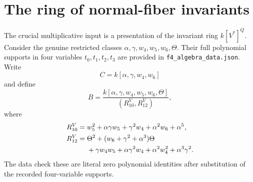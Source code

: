 \documentclass[11pt,a4paper]{article}
\theoremstyle{remark}\newtheorem{remark}[theorem]{Remark}
\begin{document}
\section{The ring of normal-fiber invariants}\label{sec:fiber}
The crucial multiplicative input is a presentation of the invariant ring \(k[V^*]^Q\). Consider the genuine restricted classes \(\alpha,\gamma,w_4,w_5,w_6,\Theta\). Their full polynomial supports in four variables \(t_0,t_1,t_2,t_3\) are provided in \texttt{f4\_algebra\_data.json}. Write
\[C=k[\alpha,\gamma,w_4,w_6]\]
and define
\begin{equation}\label{eq:Bfiber}
B=\frac{k[\alpha,\gamma,w_4,w_5,w_6,\Theta]}
{(R_{10}^{V},R_{12}^{V})},
\end{equation}
where
\begin{align}
R_{10}^{V}={}&w_5^2+\alpha\gamma w_5+\gamma^2w_4+\alpha^2w_6+\alpha^5,\label{eq:fiber10}\\
R_{12}^{V}={}&\Theta^2+(w_6+\gamma^2+\alpha^3)\Theta\notag\\
&+\gamma w_4w_5+\alpha\gamma^2w_4
+\alpha^2w_4^2+\alpha^3\gamma^2.\label{eq:fiber12}
\end{align}
The data check these are literal zero polynomial identities after substitution of the recorded four-variable supports.
\end{document}

